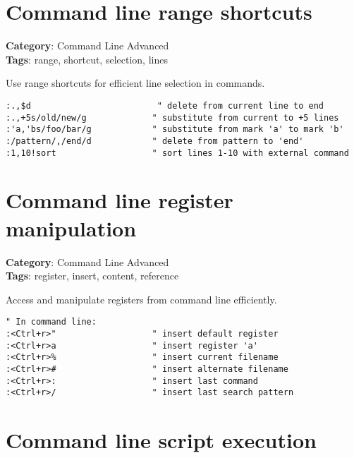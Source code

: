 {{{\section{Command line range shortcuts}

\textbf{Category}: Command Line Advanced\\ \textbf{Tags}: range, shortcut, selection, lines
\vspace{0.5cm}

Use range shortcuts for efficient line selection in commands.

\begin{Exa*}{}
\begin{Verbatim}[fontsize=\footnotesize, breaklines, breakanywhere]
:.,$d                         " delete from current line to end
:.,+5s/old/new/g             " substitute from current to +5 lines
:'a,'bs/foo/bar/g            " substitute from mark 'a' to mark 'b'
:/pattern/,/end/d            " delete from pattern to 'end'
:1,10!sort                   " sort lines 1-10 with external command
\end{Verbatim}
\end{Exa*}

\section{Command line register manipulation}

\textbf{Category}: Command Line Advanced\\ \textbf{Tags}: register, insert, content, reference
\vspace{0.5cm}

Access and manipulate registers from command line efficiently.

\begin{Exa*}{}
\begin{Verbatim}[fontsize=\footnotesize, breaklines, breakanywhere]
" In command line:
:<Ctrl+r>"                   " insert default register
:<Ctrl+r>a                   " insert register 'a'
:<Ctrl+r>%                   " insert current filename
:<Ctrl+r>#                   " insert alternate filename
:<Ctrl+r>:                   " insert last command
:<Ctrl+r>/                   " insert last search pattern
\end{Verbatim}
\end{Exa*}

\section{Command line script execution}

}}}
